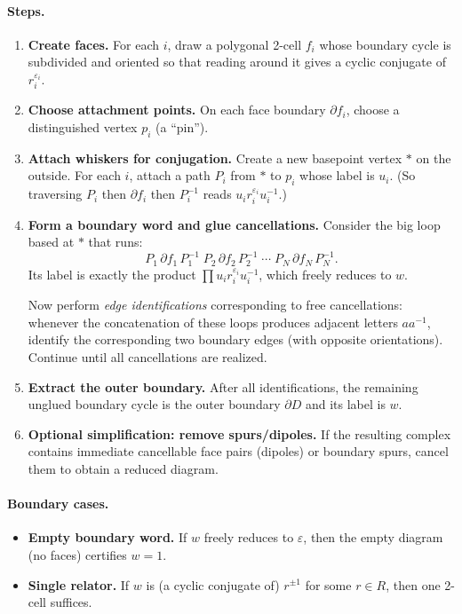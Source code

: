 \documentclass[11pt]{article}
\theoremstyle{definition}
\theoremstyle{plain}
\theoremstyle{remark}
\begin{document}
\paragraph{Steps.}
\begin{enumerate}[leftmargin=2.2em]
\item \textbf{Create faces.}
For each $i$, draw a polygonal 2-cell $f_i$ whose boundary cycle is subdivided and oriented so that reading around it gives a cyclic conjugate of $r_i^{\varepsilon_i}$.

\item \textbf{Choose attachment points.}
On each face boundary $\partial f_i$, choose a distinguished vertex $p_i$ (a ``pin'').

\item \textbf{Attach whiskers for conjugation.}
Create a new basepoint vertex $*$ on the outside.
For each $i$, attach a path $P_i$ from $*$ to $p_i$ whose label is $u_i$.
(So traversing $P_i$ then $\partial f_i$ then $P_i^{-1}$ reads $u_i r_i^{\varepsilon_i}u_i^{-1}$.)

\item \textbf{Form a boundary word and glue cancellations.}
Consider the big loop based at $*$ that runs:
\[
P_1\,\partial f_1\,P_1^{-1}\; P_2\,\partial f_2\,P_2^{-1}\;\cdots\; P_N\,\partial f_N\,P_N^{-1}.
\]
Its label is exactly the product $\prod u_i r_i^{\varepsilon_i}u_i^{-1}$, which freely reduces to $w$.

Now perform \emph{edge identifications} corresponding to free cancellations:
whenever the concatenation of these loops produces adjacent letters $a a^{-1}$, identify the corresponding two boundary edges (with opposite orientations).
Continue until all cancellations are realized.

\item \textbf{Extract the outer boundary.}
After all identifications, the remaining unglued boundary cycle is the outer boundary $\partial D$ and its label is $w$.

\item \textbf{Optional simplification: remove spurs/dipoles.}
If the resulting complex contains immediate cancellable face pairs (dipoles) or boundary spurs, cancel them to obtain a reduced diagram.
\end{enumerate}

\paragraph{Boundary cases.}
\begin{itemize}[leftmargin=2em]
\item \textbf{Empty boundary word.} If $w$ freely reduces to $\varepsilon$, then the empty diagram (no faces) certifies $w=1$.
\item \textbf{Single relator.} If $w$ is (a cyclic conjugate of) $r^{\pm1}$ for some $r\in R$, then one 2-cell suffices.
\end{itemize}
\end{document}
